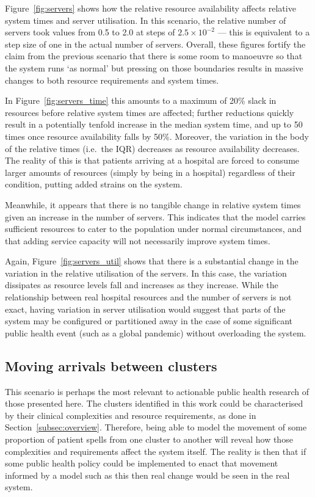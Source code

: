 \documentclass[11pt]{article}
\begin{document}
Figure~\ref{fig:servers} shows how the relative resource availability affects
relative system times and server utilisation. In this scenario, the relative
number of servers took values from 0.5 to 2.0 at steps of \(2.5 \times 10^{-2}\)
--- this is equivalent to a step size of one in the actual number of servers.
Overall, these figures fortify the claim from the previous scenario that there
is some room to manoeuvre so that the system runs `as normal' but pressing on
those boundaries results in massive changes to both resource requirements and
system times.

In Figure~\ref{fig:servers_time} this amounts to a maximum of 20\% slack in
resources before relative system times are affected; further reductions quickly
result in a potentially tenfold increase in the median system time, and up to 50
times once resource availability falls by 50\%. Moreover, the variation in the
body of the relative times (i.e.\ the IQR) decreases as resource availability
decreases. The reality of this is that patients arriving at a hospital are
forced to consume larger amounts of resources (simply by being in a hospital)
regardless of their condition, putting added strains on the system.

Meanwhile, it appears that there is no tangible change in relative system times
given an increase in the number of servers. This indicates that the model
carries sufficient resources to cater to the population under normal
circumstances, and that adding service capacity will not necessarily improve
system times.

Again, Figure~\ref{fig:servers_util} shows that there is a substantial change in
the variation in the relative utilisation of the servers. In this case, the
variation dissipates as resource levels fall and increases as they increase.
While the relationship between real hospital resources and the number of servers
is not exact, having variation in server utilisation would suggest that parts of
the system may be configured or partitioned away in the case of some significant
public health event (such as a global pandemic) without overloading the system.


\subsection{Moving arrivals between clusters}\label{subsec:moving}

This scenario is perhaps the most relevant to actionable public health research
of those presented here. The clusters identified in this work could be
characterised by their clinical complexities and resource requirements, as done
in Section~\ref{subsec:overview}. Therefore, being able to model the movement of
some proportion of patient spells from one cluster to another will reveal how
those complexities and requirements affect the system itself. The reality is
then that if some public health policy could be implemented to enact that
movement informed by a model such as this then real change would be seen in the
real system.
\end{document}
